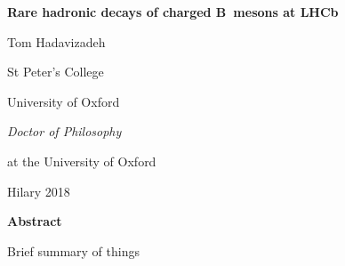

\begin{alwayssingle} 
 \thispagestyle{empty}
 \vspace*{-1in}
 \begin{center}
   { \Large {\bfseries {Rare hadronic decays of charged B~mesons at LHCb}} \par}
   {{\large \vspace*{1ex} Tom Hadavizadeh} \par}
   {\large \vspace*{1ex}
   {{St Peter's College} \par}
   {University of Oxford \par}
   \vspace*{1ex}
   {{\it \submittedtext} \par}
   {\it {Doctor of Philosophy} \par}
    \vspace*{1ex}
    {{at the University of Oxford} \par}
    \vspace*{2ex}
    {Hilary 2018}\par}
    \vspace*{1.5cm}
    {\Large \bfseries  Abstract}
  \end{center}

  Brief summary of things
\end{alwayssingle}